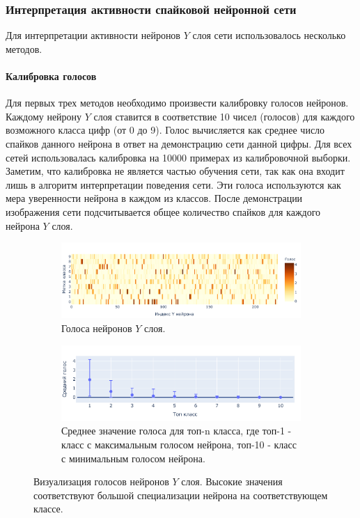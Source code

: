 \documentclass[a4paper]{article}
\begin{document}
\subsubsection{Интерпретация активности спайковой нейронной сети}
Для интерпретации активности нейронов $Y$ слоя сети использовалось несколько методов.


\paragraph{Калибровка голосов} \label{calibration}
Для первых трех методов необходимо произвести калибровку голосов нейронов. Каждому нейрону $Y$ слоя ставится в соответствие 10 чисел (голосов) для каждого возможного класса цифр (от 0 до 9). Голос вычисляется как среднее число спайков данного нейрона в ответ на демонстрацию сети данной цифры. Для всех сетей использовалась калибровка на 10000 примерах из калибровочной выборки. Заметим, что калибровка не является частью обучения сети, так как она входит лишь в алгоритм интерпретации поведения сети. Эти голоса используются как мера уверенности нейрона в каждом из классов. После демонстрации изображения сети подсчитывается общее количество спайков для каждого нейрона $Y$ слоя.

\begin{figure}
\centering
\begin{subfigure}{.5\textwidth}
    \includegraphics[width=\textwidth,keepaspectratio=true]{votes_ru.pdf}
    \caption{Голоса нейронов $Y$ слоя.}
\end{subfigure} 
\begin{subfigure}{.5\textwidth} 
    \includegraphics[width=\textwidth,keepaspectratio=true]{votes_distribution_ru.pdf}
    \caption{Среднее значение голоса для топ-n класса, где топ-1 - класс с максимальным голосом нейрона, топ-10 - класс с минимальным голосом нейрона.}
\end{subfigure}
\caption{Визуализация голосов нейронов $Y$ слоя. Высокие значения соответствуют большой специализации нейрона на соответствующем классе.}
\end{figure}
\end{document}
